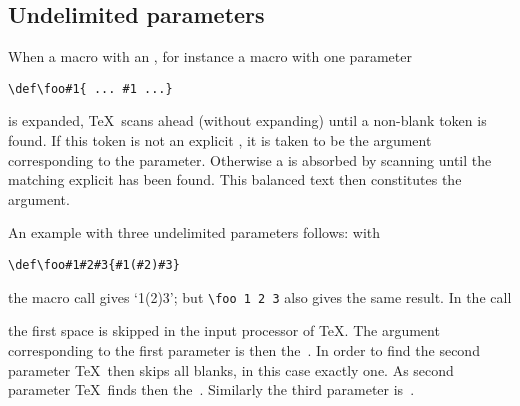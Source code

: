 \subsection{Undelimited parameters}

When a macro with an , for instance
a macro  with one parameter
\begin{verbatim}
\def\foo#1{ ... #1 ...}
\end{verbatim}
is expanded, \TeX\ scans ahead (without expanding)
until a non-blank token is found.
If this token is not an explicit , 
it is taken to be the argument
corresponding to the parameter. Otherwise a 
is absorbed by scanning until the matching explicit
 has been found.
This balanced text then
constitutes the argument.

An example with three undelimited parameters follows: with
\begin{verbatim}
\def\foo#1#2#3{#1(#2)#3}
\end{verbatim}
the macro call  gives `\hbox{1(2)3}';
but \hbox{\verb-\foo 1 2 3-} also gives the same result.
In the call
\begin{disp}\end{disp}
the first space is skipped in the input processor of \TeX.
The argument corresponding to the first parameter is then
the~. In order to find the second parameter \TeX\ then
skips all blanks, in this case exactly one. As second
parameter \TeX\ finds then the~. Similarly the third
parameter is~.


